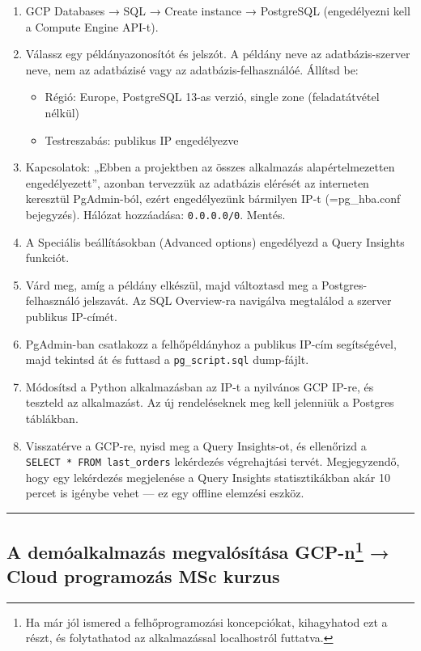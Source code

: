 \documentclass[
  magyar,
]{article}
\providecommand{\tightlist}{%
  \setlength{\itemsep}{0pt}\setlength{\parskip}{0pt}}
\begin{document}
\begin{enumerate}
\def\labelenumi{\arabic{enumi}.}
\tightlist
\item
  GCP Databases → SQL → Create instance → PostgreSQL (engedélyezni kell
  a Compute Engine API-t).
\item
  Válassz egy példányazonosítót és jelszót. A példány neve az
  adatbázis-szerver neve, nem az adatbázisé vagy az
  adatbázis-felhasználóé. Állítsd be:

  \begin{itemize}
  \tightlist
  \item
    Régió: Europe, PostgreSQL 13-as verzió, single zone (feladatátvétel
    nélkül)
  \item
    Testreszabás: publikus IP engedélyezve
  \end{itemize}
\item
  Kapcsolatok: „Ebben a projektben az összes alkalmazás
  alapértelmezetten engedélyezett'', azonban tervezzük az adatbázis
  elérését az interneten keresztül PgAdmin-ból, ezért engedélyezünk
  bármilyen IP-t (=pg\_hba.conf bejegyzés). Hálózat hozzáadása:
  \texttt{0.0.0.0/0}. Mentés.
\item
  A Speciális beállításokban (Advanced options) engedélyezd a Query
  Insights funkciót.
\item
  Várd meg, amíg a példány elkészül, majd változtasd meg a
  Postgres-felhasználó jelszavát. Az SQL Overview-ra navigálva
  megtalálod a szerver publikus IP-címét.
\item
  PgAdmin-ban csatlakozz a felhőpéldányhoz a publikus IP-cím
  segítségével, majd tekintsd át és futtasd a \texttt{pg\_script.sql}
  dump-fájlt.
\item
  Módosítsd a Python alkalmazásban az IP-t a nyilvános GCP IP-re, és
  teszteld az alkalmazást. Az új rendeléseknek meg kell jelenniük a
  Postgres táblákban.
\item
  Visszatérve a GCP-re, nyisd meg a Query Insights-ot, és ellenőrizd a
  \texttt{SELECT\ *\ FROM\ last\_orders} lekérdezés végrehajtási tervét.
  Megjegyzendő, hogy egy lekérdezés megjelenése a Query Insights
  statisztikákban akár 10 percet is igénybe vehet --- ez egy offline
  elemzési eszköz.
\end{enumerate}

\begin{center}\rule{0.5\linewidth}{0.5pt}\end{center}

\subsection[A demóalkalmazás megvalósítása GCP-n → Cloud programozás MSc
kurzus]{\texorpdfstring{A demóalkalmazás megvalósítása GCP-n\footnote{Ha
  már jól ismered a felhőprogramozási koncepciókat, kihagyhatod ezt a
  részt, és folytathatod az alkalmazással localhostról futtatva.} →
Cloud programozás MSc
kurzus}{A demóalkalmazás megvalósítása GCP-n → Cloud programozás MSc kurzus}}\label{a-demuxf3alkalmazuxe1s-megvaluxf3suxedtuxe1sa-gcp-n33-cloud-programozuxe1s-msc-kurzus}
\end{document}

